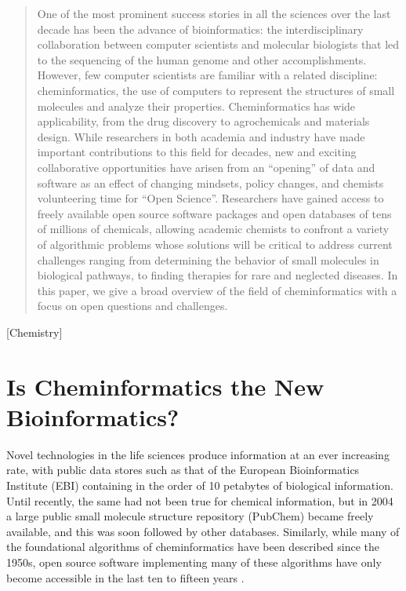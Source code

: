 \documentclass{../sig-alternate}
\begin{document}
\maketitle
\begin{abstract}
  One of the most prominent success stories in all the sciences over
  the last decade has been the advance of bioinformatics: the
  interdisciplinary collaboration between computer scientists and
  molecular biologists that led to the
  sequencing of the human genome and other accomplishments. However,
  few computer scientists are familiar
  with a related discipline: cheminformatics, the use of computers to
  represent the structures of small molecules and analyze their
  properties.  Cheminformatics has wide applicability, from the
  drug discovery to agrochemicals and materials design. 
  While researchers in both academia and industry have made important 
  contributions to this field for decades, new and 
  exciting collaborative opportunities have arisen from an ``opening'' of 
  data and software as an effect of changing mindsets,
  policy changes, 
  and chemists volunteering time
  for ``Open Science''.  Researchers have gained access to
  freely available open source software packages and open databases of tens of millions
  of chemicals, allowing academic chemists to confront a variety of 
  algorithmic problems whose solutions will be critical to address 
  current challenges ranging from
  determining the behavior of small molecules in biological pathways,
  to finding therapies for rare and neglected diseases.
  In this paper, we give a broad overview of the field of cheminformatics with a
  focus on open questions and challenges. 
\end{abstract}

[Chemistry]

\section{Is Cheminformatics the New \\Bioinformatics?}

Novel technologies in the life sciences produce information at an
ever increasing rate, with public data stores such as that of the
European Bioinformatics Institute (EBI) containing in the order of 10
petabytes of biological information.  Until recently, the same 
had not been true for
chemical information, but in 2004 a
large public small molecule structure repository (PubChem) became
freely available, and this was soon followed by other databases. 
Similarly, while many of
the foundational algorithms of cheminformatics have been described
since the 1950s, open source software implementing many of
these algorithms have only become accessible in the last ten to fifteen
years \cite{faulon2010}.
\end{document}
